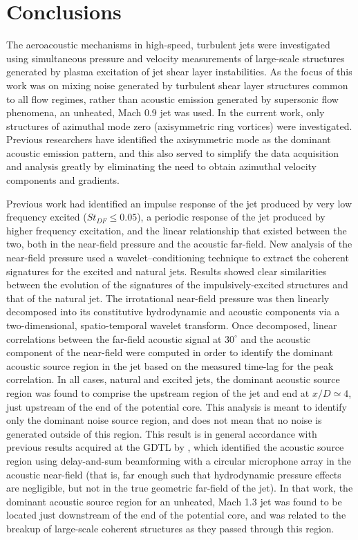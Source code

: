 \section{Conclusions}
The aeroacoustic mechanisms in high-speed, turbulent jets were investigated using simultaneous pressure and velocity measurements of large-scale structures generated by plasma excitation of jet shear layer instabilities.
As the focus of this work was on mixing noise generated by turbulent shear layer structures common to all flow regimes, rather than acoustic emission generated by supersonic flow phenomena, an unheated, Mach 0.9 jet was used.
In the current work, only structures of azimuthal mode zero (axisymmetric ring vortices) were investigated. Previous researchers have identified the axisymmetric mode as the dominant acoustic emission pattern, and this also served to simplify the data acquisition and analysis greatly by eliminating the need to obtain azimuthal velocity components and gradients.

Previous work had identified an impulse response of the jet produced by very low frequency excited ($St_{DF} \leq 0.05$), a periodic response of the jet produced by higher frequency excitation, and the linear relationship that existed between the two, both in the near-field pressure and the acoustic far-field.
New analysis of the near-field pressure used a wavelet--conditioning technique to extract the coherent signatures for the excited and natural jets.
Results showed clear similarities between the evolution of the signatures of the impulsively-excited structures and that of the natural jet.
The irrotational near-field pressure was then linearly decomposed into its constitutive hydrodynamic and acoustic components via a two-dimensional, spatio-temporal wavelet transform.
Once decomposed, linear correlations between the far-field acoustic signal at $30^\circ$ and the acoustic component of the near-field were computed in order to identify the dominant acoustic source region in the jet based on the measured time-lag for the peak correlation.
In all cases, natural and excited jets, the dominant acoustic source region was found to comprise the upstream region of the jet and end at $x/D \simeq 4$, just upstream of the end of the potential core.
This analysis is meant to identify only the dominant noise source region, and does not mean that no noise is generated outside of this region.
This result is in general accordance with previous results acquired at the GDTL by \citet{Hileman2005}, which identified the acoustic source region using delay-and-sum beamforming with a circular microphone array in the acoustic near-field (that is, far enough such that hydrodynamic pressure effects are negligible, but not in the true geometric far-field of the jet).
In that work, the dominant acoustic source region for an unheated, Mach 1.3 jet was found to be located just downstream of the end of the potential core, and was related to the breakup of large-scale coherent structures as they passed through this region.

